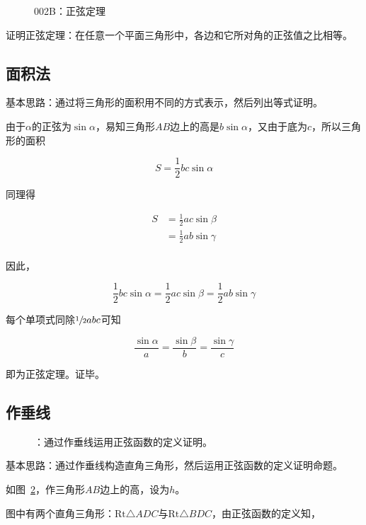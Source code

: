 

\begin{figure}[htbp]
  \centering
  \caption{002B：正弦定理} \label{fig:002B}
\end{figure}

证明正弦定理：在任意一个平面三角形中，各边和它所对角的正弦值之比相等。

\subsection{面积法}

基本思路：通过将三角形的面积用不同的方式表示，然后列出等式证明。

由于$\alpha$的正弦为$\sin\alpha$，易知三角形$AB$边上的高是$b\sin\alpha$，又由于底为$c$，所以三角形的面积

\[ S = \frac12bc\sin\alpha \]

同理得

\begin{align*}
  S &= \frac12ac\sin\beta \\
  &= \frac12ab\sin\gamma \\
\end{align*}

因此，

\[ \frac12bc\sin\alpha = \frac12ac\sin\beta = \frac12ab\sin\gamma \]

每个单项式同除$\sfrac12abc$可知

\[ \frac{\sin\alpha}a = \frac{\sin\beta}b = \frac{\sin\gamma}c \]

即为正弦定理。证毕。

\subsection{作垂线} \label{subsec:002B-vert}

\begin{figure}[htbp]
  \centering
  \caption{：通过作垂线运用正弦函数的定义证明。}
  \label{fig:002B-vert}
\end{figure}

基本思路：通过作垂线构造直角三角形，然后运用正弦函数的定义证明命题。

如图~\ref{fig:002B-vert}，作三角形$AB$边上的高，设为$h$。

图中有两个直角三角形：$\mathrm{Rt}\triangle ADC$与$\mathrm{Rt}\triangle BDC$，由正弦函数的定义知，

